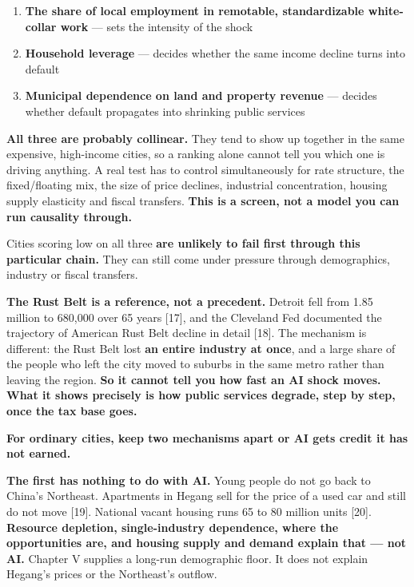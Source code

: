 \documentclass[11pt,a4paper]{article}
\begin{document}
\begin{enumerate}
  \item \textbf{The share of local employment in remotable, standardizable white-collar work} --- sets the intensity of the shock
  \item \textbf{Household leverage} --- decides whether the same income decline turns into default
  \item \textbf{Municipal dependence on land and property revenue} --- decides whether default propagates into shrinking public services
\end{enumerate}

\textbf{All three are probably collinear.} They tend to show up together in the same expensive, high-income cities, so a ranking alone cannot tell you which one is driving anything. A real test has to control simultaneously for rate structure, the fixed/floating mix, the size of price declines, industrial concentration, housing supply elasticity and fiscal transfers. \textbf{This is a screen, not a model you can run causality through.}

Cities scoring low on all three \textbf{are unlikely to fail first through this particular chain.} They can still come under pressure through demographics, industry or fiscal transfers.

\textbf{The Rust Belt is a reference, not a precedent.} Detroit fell from 1.85 million to 680,000 over 65 years [17], and the Cleveland Fed documented the trajectory of American Rust Belt decline in detail [18]. The mechanism is different: the Rust Belt lost \textbf{an entire industry at once}, and a large share of the people who left the city moved to suburbs in the same metro rather than leaving the region. \textbf{So it cannot tell you how fast an AI shock moves. What it shows precisely is how public services degrade, step by step, once the tax base goes.}

\textbf{For ordinary cities, keep two mechanisms apart or AI gets credit it has not earned.}

\textbf{The first has nothing to do with AI.} Young people do not go back to China's Northeast. Apartments in Hegang sell for the price of a used car and still do not move [19]. National vacant housing runs 65 to 80 million units [20]. \textbf{Resource depletion, single-industry dependence, where the opportunities are, and housing supply and demand explain that --- not AI.} Chapter V supplies a long-run demographic floor. It does not explain Hegang's prices or the Northeast's outflow.
\end{document}
